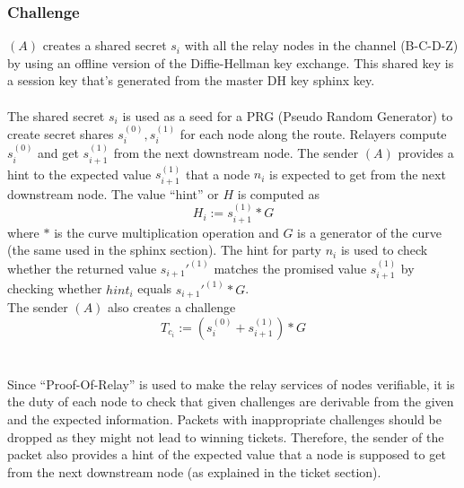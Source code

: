 \subsubsection{Challenge}
$(A)$ creates a shared secret $s_i$ with all the relay nodes in the channel (B-C-D-Z) by using an offline version of the Diffie-Hellman key exchange. This shared key is a session key that's generated from the master DH key sphinx key.
    \\~\\ The shared secret $s_i$ is used as a seed for a PRG (Pseudo Random Generator) to create secret shares $s_i^{(0)},s_i^{(1)}$ for each node along the route.
    Relayers compute $s_i^{(0)}$ and get $s_{i+1}^{(1)}$ from the next downstream node.
    \newline The sender $(A)$ provides a hint to the expected value $s_{i+1}^{(1)}$ that a node $n_i$ is expected to get from the next downstream node.
    The value “hint” or $H$ is computed as $$H_i:=s_{i+1}^{(1)}*G$$ where $*$ is the curve multiplication operation and $G$ is a generator of the curve (the same used in the sphinx section). 
    \newline The hint for party $n_i$ is used to check whether the returned value $s_{i+1}'^{(1)}$ matches the promised value $s_{i+1}^{(1)}$ by checking whether $hint_i$ equals $s_{i+1}'^{(1)}*G$. 
   \\The sender $(A)$ also creates a challenge $$T_{c_i}:=(s_i^{(0)}+s_{i+1}^{(1)})*G$$ 
   \\~\\Since “Proof-Of-Relay” is used to make the relay services of nodes verifiable, it is the duty of each node to check that given challenges are derivable from the given and the expected information.
Packets with inappropriate challenges should be dropped as they might not lead to winning tickets.
Therefore, the sender of the packet also provides a hint of the expected value that a node is supposed to get from the next downstream node (as explained in the ticket section).
